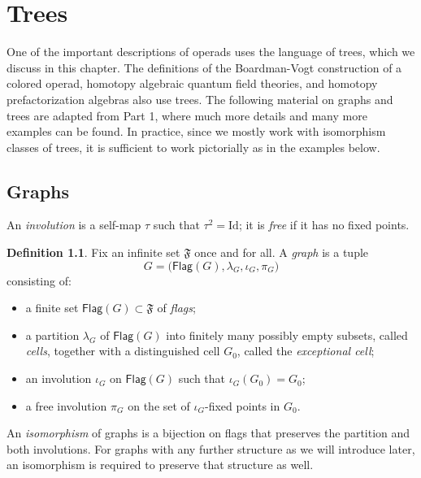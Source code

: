 \documentclass{amsbook}
\numberwithin{section}{chapter}
\numberwithin{subsection}{section}
\numberwithin{equation}{section}
\theoremstyle{plain}
\theoremstyle{definition}
\newtheorem{definition}[equation]{Definition}
\newcommand{\Flag}{\mathsf{Flag}}
\newcommand{\Id}{\mathrm{Id}}
\begin{document}
\chapter{Trees}\label{ch:tree}

One of the important descriptions of operads uses the language of trees, which we discuss in this chapter.  The definitions of the Boardman-Vogt construction of a colored operad, homotopy algebraic quantum field theories, and homotopy prefactorization algebras also use trees.  The following material on graphs and trees are adapted from \cite{bluemonster} Part 1, where much more details and many more examples can be found.  In practice, since we mostly work with isomorphism classes of trees, it is sufficient to work pictorially as in the examples below.

\section{Graphs}\label{sec:graphs} 

An \emph{involution} is a self-map $\tau$ such that $\tau^2 = \Id$; it is \emph{free} if it has no fixed points.

\begin{definition}\label{def:graph} Fix an infinite set $\mathfrak{F}$ once and for all.  A \emph{graph} is a tuple\label{notation:flag} \[G = \bigl(\Flag(G),\lambda_G,\iota_G,\pi_G\bigr)\] consisting of:
\begin{itemize}\item a finite set $\Flag(G) \subset \mathfrak{F}$ of \emph{flags};
\item a partition  $\lambda_G$ of $\Flag(G)$ into finitely many possibly empty subsets, called \emph{cells}, together with a distinguished cell $G_0$, called the \emph{exceptional cell};
\item an involution $\iota_G$ on $\Flag(G)$ such that $\iota_G(G_0)=G_0$;
\item a free involution $\pi_G$ on the set of $\iota_G$-fixed points in $G_0$.
\end{itemize}
An \emph{isomorphism} of graphs is a bijection on flags that preserves the partition and both involutions.  For graphs with any further structure as we will introduce later, an isomorphism is required to preserve that structure as well.
\end{definition}
\end{document}

